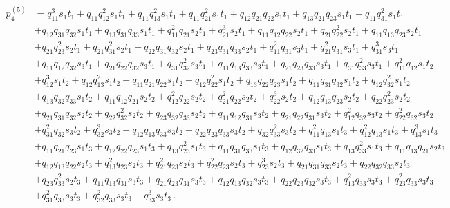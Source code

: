 \documentclass[10pt]{amsart}
\theoremstyle{definition}
\theoremstyle{corollary}
\theoremstyle{remark}
\theoremstyle{conclusion}
\begin{document}
{\small \begin{align}
p_4^{(5)}&=q_{11}^3 s_1 t_1 + q_{11} q_{12}^2 s_1 t_1 + q_{11} q_{13}^2 s_1 t_1 + q_{11} q_{21}^2 s_1 t_1 + 
q_{12} q_{21} q_{22} s_1 t_1 + q_{13} q_{21} q_{23} s_1 t_1 + q_{11} q_{31}^2 s_1 t_1\nonumber \\
& + 
q_{12} q_{31} q_{32} s_1 t_1 + q_{13} q_{31} q_{33} s_1 t_1 + q_{11}^2 q_{21} s_2 t_1 + 
q_{21}^3 s_2 t_1 + q_{11} q_{12} q_{22} s_2 t_1 + q_{21} q_{22}^2 s_2 t_1 + 
q_{11} q_{13} q_{23} s_2 t_1 \nonumber \\
&+ q_{21} q_{23}^2 s_2 t_1 + q_{21} q_{31}^2 s_2 t_1 + 
q_{22} q_{31} q_{32} s_2 t_1 + q_{23} q_{31} q_{33} s_2 t_1 + q_{11}^2 q_{31} s_3 t_1 + 
q_{21}^2 q_{31} s_3 t_1 + q_{31}^3 s_3 t_1\nonumber \\
& + q_{11} q_{12} q_{32} s_3 t_1 + 
q_{21} q_{22} q_{32} s_3 t_1 + q_{31} q_{32}^2 s_3 t_1 + q_{11} q_{13} q_{33} s_3 t_1 + 
q_{21} q_{23} q_{33} s_3 t_1 + q_{31} q_{33}^2 s_3 t_1 + q_{11}^2 q_{12} s_1 t_2\nonumber  \\
&+ q_{12}^3 s_1 t_2 +
q_{12} q_{13}^2 s_1 t_2 + q_{11} q_{21} q_{22} s_1 t_2 + q_{12} q_{22}^2 s_1 t_2 + 
q_{13} q_{22} q_{23} s_1 t_2 + q_{11} q_{31} q_{32} s_1 t_2 + q_{12} q_{32}^2 s_1 t_2\nonumber  \\
&+ 
q_{13} q_{32} q_{33} s_1 t_2 + q_{11} q_{12} q_{21} s_2 t_2 + q_{12}^2 q_{22} s_2 t_2 + 
q_{21}^2 q_{22} s_2 t_2 + q_{22}^3 s_2 t_2 + q_{12} q_{13} q_{23} s_2 t_2 + q_{22} q_{23}^2 s_2 t_2 \nonumber \\
& +
q_{21} q_{31} q_{32} s_2 t_2 + q_{22} q_{32}^2 s_2 t_2 + q_{23} q_{32} q_{33} s_2 t_2 + 
q_{11} q_{12} q_{31} s_3 t_2 + q_{21} q_{22} q_{31} s_3 t_2 + q_{12}^2 q_{32} s_3 t_2 + 
q_{22}^2 q_{32} s_3 t_2 \nonumber \\
&+ q_{31}^2 q_{32} s_3 t_2 + q_{32}^3 s_3 t_2 + q_{12} q_{13} q_{33} s_3 t_2 +
q_{22} q_{23} q_{33} s_3 t_2 + q_{32} q_{33}^2 s_3 t_2 + q_{11}^2 q_{13} s_1 t_3 + 
q_{12}^2 q_{13} s_1 t_3 + q_{13}^3 s_1 t_3 \nonumber \\
&+ q_{11} q_{21} q_{23} s_1 t_3 + 
q_{12} q_{22} q_{23} s_1 t_3 + q_{13} q_{23}^2 s_1 t_3 + q_{11} q_{31} q_{33} s_1 t_3 + 
q_{12} q_{32} q_{33} s_1 t_3 + q_{13} q_{33}^2 s_1 t_3 + q_{11} q_{13} q_{21} s_2 t_3 \nonumber  \\
&+ 
q_{12} q_{13} q_{22} s_2 t_3 + q_{13}^2 q_{23} s_2 t_3 + q_{21}^2 q_{23} s_2 t_3 + 
q_{22}^2 q_{23} s_2 t_3 + q_{23}^3 s_2 t_3 + q_{21} q_{31} q_{33} s_2 t_3 + 
q_{22} q_{32} q_{33} s_2 t_3 \nonumber \\
&+ q_{23} q_{33}^2 s_2 t_3 + q_{11} q_{13} q_{31} s_3 t_3 + 
q_{21} q_{23} q_{31} s_3 t_3 + q_{12} q_{13} q_{32} s_3 t_3 + q_{22} q_{23} q_{32} s_3 t_3 + 
q_{13}^2 q_{33} s_3 t_3 + q_{23}^2 q_{33} s_3 t_3 \nonumber  \\
&+ q_{31}^2 q_{33} s_3 t_3 + 
q_{32}^2 q_{33} s_3 t_3 + q_{33}^3 s_3 t_3 \, .
\label{poldeg5}
\end{align}}
\end{document}
